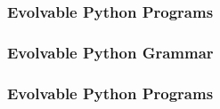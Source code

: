 \documentclass[aspectratio=169]{beamer}
\makeatletter
\renewcommand{\emphasis}[1]{{\Huge \color{pureminimalistic@text@red} #1}}
\newcommand{\red}[1]{{\color{pureminimalistic@text@red} #1}}
\newcommand{\ca}[1]{{\color{c1} #1}}
\newcommand{\cb}[1]{{\color{c2} #1}}
\newcommand{\cc}[1]{{\color{c3} #1}}
\newcommand{\cd}[1]{{\color{c5} #1}}
\makeatother
\begin{document}
\begin{frame}[fragile]\frametitle{Evolvable Python Programs}
  
\end{frame}

\begin{frame}[fragile]\frametitle{Evolvable Python Grammar}
  
\end{frame}

\begin{frame}[fragile]\frametitle{Evolvable Python Programs}
\end{frame}

% 
\end{document}
